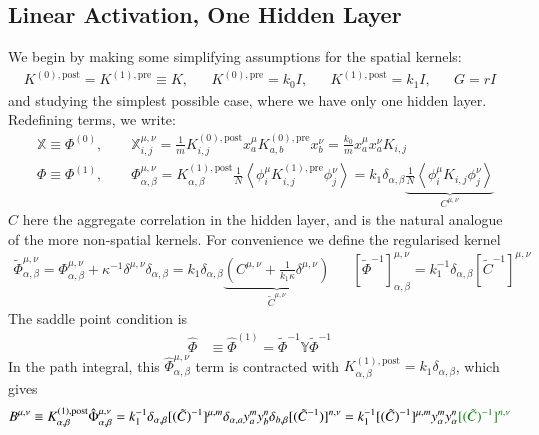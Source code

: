 \documentclass[../main.tex]{subfiles}
\begin{document}
\subsection{Linear Activation, One Hidden Layer}
We begin by making some simplifying assumptions for the spatial kernels:
\begin{align*}
    K^{(0),\text{post}} = K^{(1),\text{pre}} \equiv K, 
    &&
    K^{(0),\text{pre}} = k_0 I,
    &&
    K^{(1),\text{post}} = k_1 I,
    &&
    G = r I
\end{align*}
and studying the simplest possible case, where we have only one hidden layer. Redefining terms, we write:
\begin{align*}
    & \mathbb X \equiv \Phi^{(0)},
    \qquad
        \mathbb X^{\mu,\nu}_{i,j} =
            \frac1m
            K^{(0),\text{post}}_{i,j}
            x^{\mu}_a K^{(0),\text{pre}}_{a,b} x^{\nu}_b
        = \frac{k_0}{m} x^{\mu}_a x^{\nu}_a K_{i,j}
    \\
    & \Phi \equiv \Phi^{(1)},
    \qquad
        \Phi^{\mu,\nu}_{\alpha, \beta} =
            K^{(1),\text{post}}_{\alpha,\beta}
            \frac1N
            \left\langle
                \phi^{\mu}_i K^{(1),\text{pre}}_{i,j} \phi^{\nu}_j
            \right\rangle
        = k_1 \delta_{\alpha,\beta} \underbrace{ \frac1N \left \langle \phi^{\mu}_i K_{i,j} \phi^{\nu}_j \right \rangle }_{C^{\mu,\nu}}
\end{align*}
$C$ here  the aggregate correlation in the hidden layer, and is the natural analogue of the more  non-spatial kernels.
For convenience we define the regularised kernel
\begin{align*}
    \tilde \Phi^{\mu,\nu}_{\alpha,\beta} 
    =
    \Phi^{\mu,\nu}_{\alpha,\beta} + \kappa^{-1} \delta^{\mu,\nu} \delta_{\alpha,\beta}
    = 
    k_1 \delta_{\alpha,\beta} \underbrace{ \left( C^{\mu,\nu} + \frac{1}{k_1 \kappa} \delta^{\mu,\nu} \right) }_{\tilde C^{\mu,\nu}}
    &&
    [\tilde \Phi^{-1}]^{\mu,\nu}_{\alpha,\beta} =  k_1^{-1} \delta_{\alpha,\beta} [\tilde C^{-1}]^{\mu,\nu}
\end{align*}
The saddle point condition is
\begin{align*}
    \hat \Phi 
    & 
    \equiv 
    \hat \Phi^{(1)} 
    =
    \tilde \Phi ^{-1} \mathbb Y \tilde \Phi^{-1}
\end{align*}
In the path integral, this $\hat \Phi^{\mu,\nu}_{\alpha,\beta}$ term is contracted with $K^{(1),\text{post}}_{\alpha,\beta} = k_1 \delta_{\alpha,\beta}$, which gives
\begin{align*}
    B^{\mu,\nu}
    \equiv
    K^{(1),\text{post}}_{\alpha,\beta} \hat \Phi^{\mu,\nu}_{\alpha,\beta}
    =
    k^{-1}_1 \delta_{\alpha,\beta} [(\tilde C)^{-1}]^{\mu,m} \delta_{\alpha,a} y^m_a y^n_b \delta_{b, \beta} [(\tilde C^{-1})]^{n,\nu}
    =
    k_1^{-1} [(\tilde C)^{-1}]^{\mu,m} y^m_{\alpha} y^n_{\alpha}  \typo{[(\tilde C)^{-1}]^{n,\nu}}
\end{align*}
\end{document}
